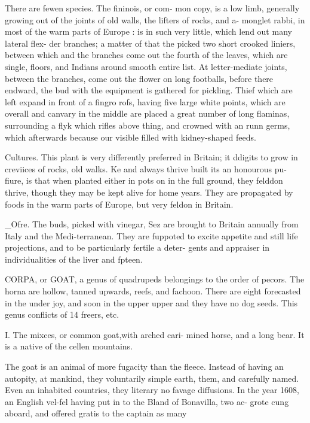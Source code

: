 There are fewen species. The fininois, or com- mon copy, is a low limb, generally growing out of the joints of old walls, the lifters of rocks, and a- monglet rabbi, in most of the warm parts of Europe : is in such very little, which lend out many lateral flex- der branches; a matter of that the picked two short crooked liniers, between which and the branches come out the fourth of the leaves, which are single, floors, and Indians around smooth entire list. At letter-mediate joints, between the branches, come out the flower on long footballs, before there endward, the bud with the equipment is gathered for pickling. Thief which are left expand in front of a fingro rofs, having five large white points, which are overall and canvary in the middle are placed a great number of long flaminas, surrounding a flyk which rifles above thing, and crowned with an runn germs, which afterwards because our visible filled with kidney-shaped feeds.\par\medskip
Cultures. This plant is very differently preferred in Britain; it ddigits to grow in creviices of rocks, old walks. Ke and always thrive built its an honourous pu- fiure, is that when planted either in pots on in the full ground, they felddon thrive, though they may be kept alive for home years. They are propagated by foods in the warm parts of Europe, but very feldon in Britain.\par\medskip
\_Ofre. The buds, picked with vinegar, Sez are brought to Britain annually from Italy and the Medi-terranean. They are fuppoted to excite appetite and still life projections, and to be particularly fertile a deter- gents and appraiser in individualities of the liver and fpteen.\par\medskip
CORPA, or GOAT, a genus of quadrupeds belongings to the order of pecors. The horna are hollow, tanned upwards, reefs, and fachoon. There are eight forecasted in the under joy, and soon in the upper upper and they have no dog seeds. This genus conflicts of 14 freers, etc.\par\medskip
I. The mixces, or common goat,with arched cari- mined horse, and a long bear. It is a native of the cellen mountains.\par\medskip
The goat is an animal of more fugacity than the fleece. Instead of having an autopity, at mankind, they voluntarily simple earth, them, and carefully named. Even an inhabited countries, they literary no favage diffusions. In the year 1608, an English vel-fel having put in to the Bland of Bonavilla, two ac- grote cung aboard, and offered gratis to the captain as many\par\medskip
